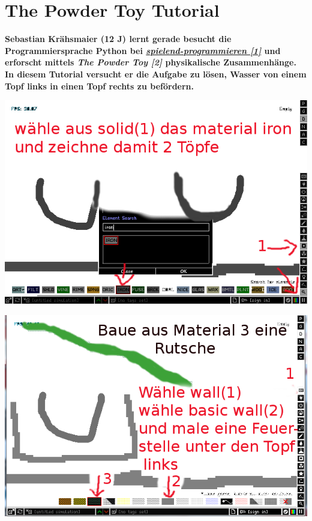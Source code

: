 \section*{The Powder Toy Tutorial}
\hypertarget{powdertoytutorial}{}
\label{powdertoytutorial}

\textbf{Sebastian Krähsmaier (12 J) lernt gerade besucht die Programmiersprache Python bei \href{http://spielend-programmieren.at}{\textit{spielend-programmieren [1]}} und erforscht mittels \textit{The Powder Toy [2]} physikalische Zusammenhänge. In diesem Tutorial versucht er die Aufgabe zu lösen, Wasser von einem Topf links in einen Topf rechts zu befördern.}

\begin{center}
\includegraphics[width=\linewidth]{powdertoytutorial/powdertoytutorial1.png}
\end{center}

\begin{center}
\includegraphics[width=\linewidth]{powdertoytutorial/powdertoytutorial2.png}
\end{center}

